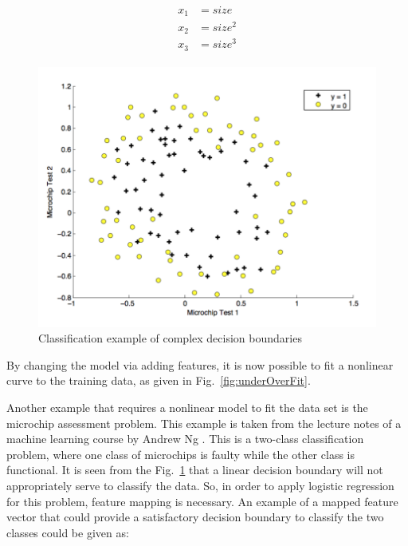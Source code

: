 \begin{align}
\label{eqn:featureMapping1}
\begin{split}
x_1 & = size
\\
x_2 & = size^2
\\
x_3 & = size^3
\end{split}
\end{align}

\begin{figure}
\begin{center}
\includegraphics[width=13cm]{figures/classificationMicrochip}    %
\caption{Classification example of complex decision boundaries \cite{andrewNg_MachLearning}} 
\label{fig:classificationEx3}
\end{center}
\end{figure}

By changing the model via adding features, it is now possible to fit a nonlinear curve to the training data, as given in Fig.~\ref{fig:underOverFit}.

Another example that requires a nonlinear model to fit the data set is the microchip assessment problem.
This example is taken from the lecture notes of a machine learning course by Andrew Ng \cite{andrewNgMachLearning}. 
This is a two-class classification problem, where one class of microchips is faulty while the other class is functional.
It is seen from the Fig.~\ref{fig:classificationEx3} that a linear decision boundary will not appropriately serve to classify the data. 
So, in order to apply logistic regression for this problem, feature mapping is necessary. 
An example of a mapped feature vector that could provide a satisfactory decision boundary to classify the two classes could be given as:

